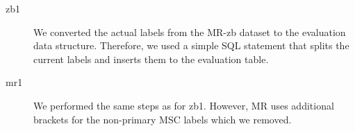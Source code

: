 \begin{description}
  \item[zb1] We converted the actual labels from the MR-zb dataset to the evaluation data structure. Therefore, we used a simple SQL statement that splits the current labels and inserts them to the evaluation table.
  \item[mr1] We performed the same steps as for zb1. However, MR uses additional brackets for the non-primary MSC labels which we removed.


\end{description}
